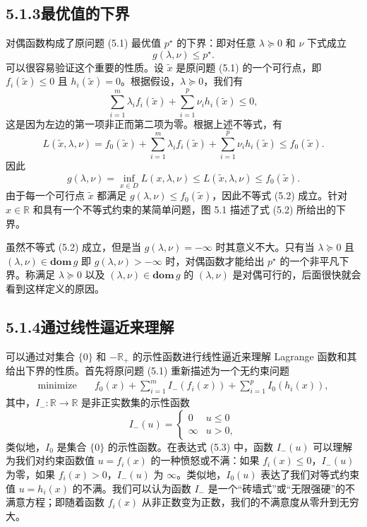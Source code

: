 \documentclass[UTF8,12pt,a4paper,fontset=fandol]{ctexart}
\begin{document}
\subsection*{5.1.3\quad 最优值的下界}

对偶函数构成了原问题 (5.1) 最优值 $p^\star$ 的下界：即对任意 $\lambda\succeq 0$ 和 $\nu$ 下式成立
\begin{equation}
g(\lambda,\nu)\leq p^\star.
\tag{5.2}
\end{equation}
可以很容易验证这个重要的性质。设 $\tilde{x}$ 是原问题 (5.1) 的一个可行点，即 $f_i(\tilde{x})\leq 0$ 且 $h_i(\tilde{x})=0$。根据假设，$\lambda\succeq 0$，我们有
\[
\sum_{i=1}^m \lambda_i f_i(\tilde{x})+\sum_{i=1}^p \nu_i h_i(\tilde{x})\leq 0,
\]
这是因为左边的第一项非正而第二项为零。根据上述不等式，有
\[
L(\tilde{x},\lambda,\nu)=f_0(\tilde{x})+\sum_{i=1}^m \lambda_i f_i(\tilde{x})+\sum_{i=1}^p \nu_i h_i(\tilde{x})\leq f_0(\tilde{x}).
\]
因此
\[
g(\lambda,\nu)=\inf_{x\in D}L(x,\lambda,\nu)\leq L(\tilde{x},\lambda,\nu)\leq f_0(\tilde{x}).
\]
由于每一个可行点 $\tilde{x}$ 都满足 $g(\lambda,\nu)\leq f_0(\tilde{x})$，因此不等式 (5.2) 成立。针对 $x\in\mathbb{R}$ 和具有一个不等式约束的某简单问题，图 5.1 描述了式 (5.2) 所给出的下界。

虽然不等式 (5.2) 成立，但是当 $g(\lambda,\nu)=-\infty$ 时其意义不大。只有当 $\lambda\succeq 0$ 且 $(\lambda,\nu)\in\mathbf{dom}\,g$ 即 $g(\lambda,\nu)>-\infty$ 时，对偶函数才能给出 $p^\star$ 的一个非平凡下界。称满足 $\lambda\succeq 0$ 以及 $(\lambda,\nu)\in\mathbf{dom}\,g$ 的 $(\lambda,\nu)$ 是对偶可行的，后面很快就会看到这样定义的原因。

\subsection*{5.1.4\quad 通过线性逼近来理解}

可以通过对集合 $\{0\}$ 和 $-\mathbb{R}_+$ 的示性函数进行线性逼近来理解 Lagrange 函数和其给出下界的性质。首先将原问题 (5.1) 重新描述为一个无约束问题
\begin{equation}
\begin{aligned}
\text{minimize}\quad
& f_0(x)+\sum_{i=1}^m I_-(f_i(x))+\sum_{i=1}^p I_0(h_i(x)),
\end{aligned}
\tag{5.3}
\end{equation}
其中，$I_-:\mathbb{R}\to\mathbb{R}$ 是非正实数集的示性函数
\[
I_-(u)=
\begin{cases}
0 & u\leq 0\\
\infty & u>0,
\end{cases}
\]
类似地，$I_0$ 是集合 $\{0\}$ 的示性函数。在表达式 (5.3) 中，函数 $I_-(u)$ 可以理解为我们对约束函数值 $u=f_i(x)$ 的一种愤怒或不满：如果 $f_i(x)\leq 0$，$I_-(u)$ 为零，如果 $f_i(x)>0$，$I_-(u)$ 为 $\infty$。类似地，$I_0(u)$ 表达了我们对等式约束值 $u=h_i(x)$ 的不满。我们可以认为函数 $I_-$ 是一个``砖墙式''或``无限强硬''的不满意方程；即随着函数 $f_i(x)$ 从非正数变为正数，我们的不满意度从零升到无穷大。
\end{document}
